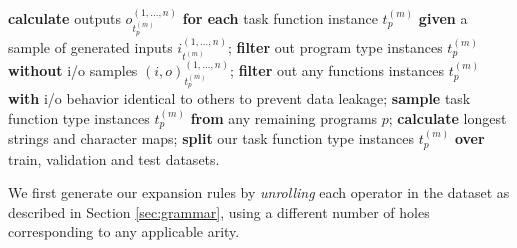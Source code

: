 \documentclass{article} %
\begin{document}
\begin{algorithm}
\begin{algorithmic}
        \State \textbf{calculate} outputs $o_{t^{(m)}_p}^{(1, \dots, n)}$ \textbf{for each} task function instance $t^{(m)}_p$ \textbf{given} a sample of generated inputs $i_{t^{(m)}}^{(1, \dots, n)}$;
        \State \textbf{filter} out program type instances $t^{(m)}_p$ \textbf{without} i/o samples $(i,o)_{t^{(m)}_p}^{(1, \dots, n)}$;
        \State \textbf{filter} out any functions instances $t^{(m)}_p$ \textbf{with} i/o behavior identical to others to prevent data leakage;
        \State \textbf{sample} task function type instances $t^{(m)}_p$ \textbf{from} any remaining programs $p$;
        \State \textbf{calculate} longest strings and character maps;
        \State \textbf{split} our task function type instances $t^{(m)}_p$ \textbf{over} train, validation and test datasets.
    \end{algorithmic} 
\end{algorithm}


We first generate our expansion rules by \emph{unrolling} each operator in the dataset
as described in Section \ref{sec:grammar},
using a different number of holes corresponding to any applicable arity.
\end{document}
